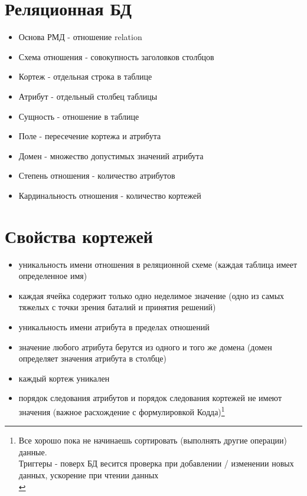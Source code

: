 \documentclass[12pt, a4paper]{article}
\begin{document}
\newpage

\section{Реляционная БД}

\begin{itemize}
    \item Основа РМД - отношение relation
    \item Схема отношения - совокупность заголовков столбцов
    \item Кортеж - отдельная строка в таблице
    \item Атрибут - отдельный столбец таблицы
    \item Сущность - отношение в таблице
    \item Поле - пересечение кортежа и атрибута
    \item Домен - множество допустимых значений атрибута
    \item Степень отношения - количество атрибутов
    \item Кардинальность отношения - количество кортежей
\end{itemize}

\section{Свойства кортежей}

\begin{itemize}
\item уникальность имени отношения в реляционной схеме (каждая таблица имеет определенное имя)
\item каждая ячейка содержит только одно неделимое значение (одно из самых тяжелых с точки зрения баталий и принятия решений)
\item уникальность имени атрибута в пределах отношений
\item значение любого атрибута берутся из одного и того же домена (домен определяет значения атрибута в столбце)
\item каждый кортеж уникален
\item порядок следования атрибутов и порядок следования кортежей не имеют значения (важное расхождение с формулировкой Кодда)\footnote{
Все хорошо пока не начинаешь сортировать (выполнять другие операции) данные. \\ Триггеры - поверх БД весится проверка при добавлении / изменении новых данных, ускорение при чтении данных \\}

\end{itemize}
\end{document}
